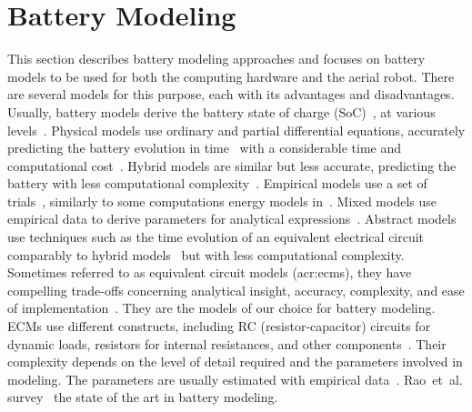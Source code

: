\section{Battery Modeling}
\label{sec:soa-ene-bat}

This section describes battery modeling approaches and focuses on battery models to be used for both the computing hardware and the aerial robot. There are several models for this purpose, each with its advantages and disadvantages. Usually, battery models derive the battery state of charge (SoC)~\citep{xia2015state}, at various levels~\citep{sunden2019thermal,kurzweil2018state,kurzweil2021state,deng2017maximum}. Physical models use ordinary and partial differential equations, accurately predicting the battery evolution in time~\citep{rao2003battery} with a considerable time and computational cost~\citep{doyle1993modeling,marcicki2013design,lotfi2017reduced,moura2017battery}. Hybrid models are similar but less accurate, predicting the battery with less computational complexity~\citep{kim2011hybrid,kim2019enhanced}. Empirical models use a set of trials~\citep{syracuse1997statistical,pedram1999design}, similarly to some computations energy models in~. Mixed models use empirical data to derive parameters for analytical expressions~\citep{rao2003battery,rakhmatov2001analytical}. Abstract models use techniques such as the time evolution of an equivalent electrical circuit~\citep{gold1997pspice,benini2001discrete,seongjun2008state,xiaosong2012comparative,xing2014state,hasan2018exogenous} comparably to hybrid models~\citep{kim2011hybrid} but with less computational complexity. Sometimes referred to as equivalent circuit models (\Gls{acr:ecm}s), they have compelling trade-offs concerning analytical insight, accuracy, complexity, and ease of implementation~\citep{rao2003battery}. They are the models of our choice for battery modeling. ECMs use different constructs, including RC (resistor-capacitor) circuits for dynamic loads, resistors for internal resistances, and other components~\citep{hamza2017forecasting}. Their complexity depends on the level of detail required and the parameters involved in modeling. The parameters are usually estimated with empirical data~\citep{zhang2014battery}. Rao~et~al. survey~\citep{rao2003battery} the state of the art in battery modeling.

